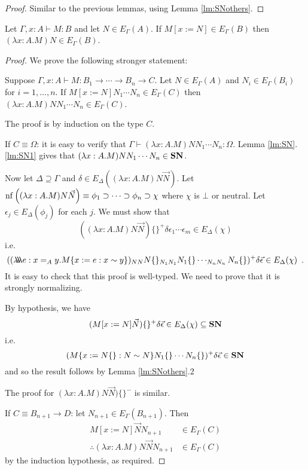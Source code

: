 \begin{proof}
Similar to the previous lemmas, using Lemma \ref{lm:SNothers}.
\end{proof}

\begin{lm}
\label{lm:wte2}
Let $\Gamma, x : A \vdash M : B$ and let $N \in E_\Gamma(A)$. If $M[x:=N] \in E_\Gamma(B)$ then $(\lambda x:A.M)N \in E_\Gamma(B)$.
\end{lm}

\begin{proof}
We prove the following stronger statement:

Suppose $\Gamma, x : A \vdash M : B_1 \rightarrow \cdots \rightarrow B_n \rightarrow C$.  Let $N \in E_\Gamma(A)$ and $N_i \in E_\Gamma(B_i)$ for $i = 1, \ldots, n$.  If
$M[x:=N]N_1 \cdots N_n \in E_\Gamma(C)$ then $(\lambda x:A.M)NN_1 \cdots N_n \in E_\Gamma(C)$.

The proof is by induction on the type $C$.

If $C \equiv \Omega$: it is easy to verify that $\Gamma \vdash (\lambda x:A.M)NN_1 \cdots N_n : \Omega$.  Lemma \ref{lm:SN}.\ref{lm:SN1}
gives that $(\lambda x:A.M)NN_1 \cdots N_n \in \mathbf{SN}$.

Now let $\Delta \supseteq \Gamma$ and $\delta \in E_\Delta((\lambda x:A.M)N \vec{N})$.  Let $\mathrm{nf} \left( {(\lambda x:A.M)N \vec{N}} \right) \equiv \phi_1 \supset \cdots \supset \phi_n \supset \chi$ where $\chi$ is $\bot$ or neutral.  Let $\epsilon_j \in E_\Delta(\phi_j)$ for each $j$.  We must show that
\[ ((\lambda x:A.M)N \vec{N})\{\}^+ \delta \epsilon_1 \cdots \epsilon_m
\in E_\Delta(\chi) \]
i.e.
\[ ((\lambda \!\! \lambda \!\! \lambda e:x =_A y. M \{ x:=e : x \sim y \})_{NN} N\{\}_{N_1 N_1}
N_1\{\} \cdots_{N_n N_n} N_n\{\})^+ \delta \vec{\epsilon} \in E_\Delta(\chi) \enspace . \]
It is easy to check that this proof is well-typed.  We need to prove that it is strongly normalizing.

By hypothesis, we have
\[ (M[x:=N] \vec{N})\{\}^+ \delta \vec{\epsilon} \in E_\Delta(\chi) \subseteq \mathbf{SN} \]
i.e.
\[ (M\{x:=N\{\} : N \sim N\} N_1 \{\} \cdots N_n \{\})^+ \delta \vec{\epsilon}
\in \mathbf{SN} \]
and so the result follows by Lemma \ref{lm:SNothers}.2

The proof for $(\lambda x:A.M)N \vec{N})\{\}^-$ is similar.

If $C \equiv B_{n+1} \rightarrow D$: let $N_{n+1} \in E_{\Gamma}(B_{n+1})$.  Then
\begin{align*}
M[x:=N]\vec{N} N_{n+1} & \in E_\Gamma(C) \\
\therefore (\lambda x:A.M)N \vec{N} N_{n+1} & \in E_\Gamma(C)
\end{align*}
by the induction hypothesis, as required.


\end{proof}
